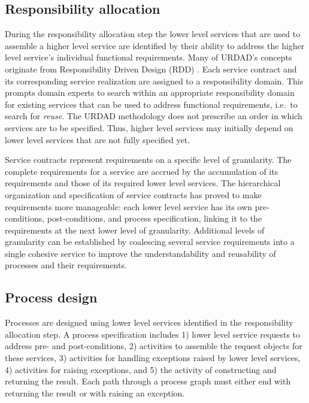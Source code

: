 \subsection{Responsibility allocation}

During the responsibility allocation step the lower level services that are used to assemble a higher level service are identified by their ability to address the higher level service's individual functional requirements. Many of URDAD's concepts originate from Responsibility Driven Design (RDD) \cite{wirfs-brock_object-oriented_1989,wirfs-brock_object_2002}. Each service contract and its corresponding service realization are assigned to a responsibility domain. This prompts domain experts to search within an appropriate responsibility domain for existing services that can be used to address functional requirements, i.e.\ to search for \emph{reuse}. The URDAD methodology does not prescribe an order in which services are to be specified. Thus, higher level services may initially depend on lower level services that are not fully specified yet.

Service contracts represent requirements on a specific level of granularity. The complete requirements for a service are accrued by the accumulation of its requirements and those of its required lower level services. The hierarchical organization and specification of service contracts has proved to make requirements more manageable: each lower level service has its own pre-conditions, post-conditions, and process specification, linking it to the requirements at the next lower level of granularity. Additional levels of granularity can be established by coalescing several service requirements into a single cohesive service to improve the understandability and reusability of processes and their requirements.

\subsection{Process design}

Processes are designed using lower level services identified in the responsibility allocation step. A process specification includes 1) lower level service requests to address pre- and post-conditions, 2) activities to assemble the request objects for these services, 3) activities for handling exceptions raised by lower level services, 4) activities for raising exceptions, and 5) the activity of constructing and returning the result. Each path through a process graph must either end with returning the result or with raising an exception.